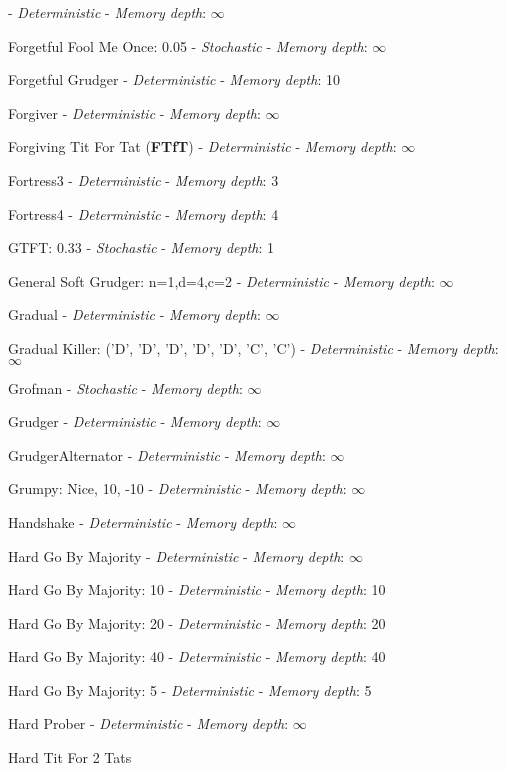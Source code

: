  - \textit{Deterministic} - \textit{Memory depth}: \(\infty\)\item Forgetful Fool Me Once: 0.05
 - \textit{Stochastic} - \textit{Memory depth}: \(\infty\)\item Forgetful Grudger
 - \textit{Deterministic} - \textit{Memory depth}: 10\item Forgiver
 - \textit{Deterministic} - \textit{Memory depth}: \(\infty\)\item Forgiving Tit For Tat
(\textbf{FTfT}) - \textit{Deterministic} - \textit{Memory depth}: \(\infty\)\item Fortress3
 - \textit{Deterministic} - \textit{Memory depth}: 3\item Fortress4
 - \textit{Deterministic} - \textit{Memory depth}: 4\item GTFT: 0.33
 - \textit{Stochastic} - \textit{Memory depth}: 1\item General Soft Grudger: n=1,d=4,c=2
 - \textit{Deterministic} - \textit{Memory depth}: \(\infty\)\item Gradual
 - \textit{Deterministic} - \textit{Memory depth}: \(\infty\)\item Gradual Killer: ('D', 'D', 'D', 'D', 'D', 'C', 'C')
 - \textit{Deterministic} - \textit{Memory depth}: \(\infty\)\item Grofman
 - \textit{Stochastic} - \textit{Memory depth}: \(\infty\)\item Grudger
 - \textit{Deterministic} - \textit{Memory depth}: \(\infty\)\item GrudgerAlternator
 - \textit{Deterministic} - \textit{Memory depth}: \(\infty\)\item Grumpy: Nice, 10, -10
 - \textit{Deterministic} - \textit{Memory depth}: \(\infty\)\item Handshake
 - \textit{Deterministic} - \textit{Memory depth}: \(\infty\)\item Hard Go By Majority
 - \textit{Deterministic} - \textit{Memory depth}: \(\infty\)\item Hard Go By Majority: 10
 - \textit{Deterministic} - \textit{Memory depth}: 10\item Hard Go By Majority: 20
 - \textit{Deterministic} - \textit{Memory depth}: 20\item Hard Go By Majority: 40
 - \textit{Deterministic} - \textit{Memory depth}: 40\item Hard Go By Majority: 5
 - \textit{Deterministic} - \textit{Memory depth}: 5\item Hard Prober
 - \textit{Deterministic} - \textit{Memory depth}: \(\infty\)\item Hard Tit For 2 Tats
